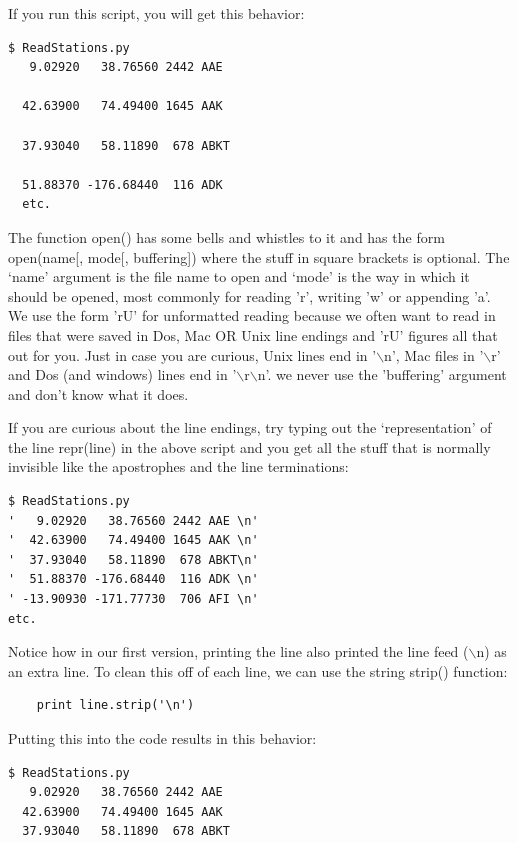 \documentclass[11pt]{book}
\begin{document}
{{If you run this script, you will get this behavior:
{ \color{blue} \begin{verbatim}
$ ReadStations.py
   9.02920   38.76560 2442 AAE

  42.63900   74.49400 1645 AAK

  37.93040   58.11890  678 ABKT

  51.88370 -176.68440  116 ADK
  etc.
  \end{verbatim}}

\noindent The function  {\color{blue}open()} has some bells and whistles to it and has the form  {\color{blue}open(name[, mode[, buffering])} where the stuff in square brackets is optional.  The `name' argument is the file name to open and `mode' is the way in which it should be opened, most commonly for reading 'r', writing 'w' or appending 'a'. We use the form 'rU' for unformatted reading because we often want to read in files that were saved in Dos, Mac OR Unix line endings and 'rU' figures all that out for you.  Just in case you are curious, Unix lines end in '$\backslash$n',  Mac files in '$\backslash$r' and Dos (and windows) lines end in '$\backslash$r$\backslash$n'.    we never use the 'buffering' argument and don't know what it does.

If you are curious about the line endings, try typing out the `representation' of the line {\color{blue}repr(line)} in the above script and you get all the  stuff that is normally  invisible like the apostrophes and the line terminations:

{ \color{blue} \begin{verbatim}
$ ReadStations.py
'   9.02920   38.76560 2442 AAE \n'
'  42.63900   74.49400 1645 AAK \n'
'  37.93040   58.11890  678 ABKT\n'
'  51.88370 -176.68440  116 ADK \n'
' -13.90930 -171.77730  706 AFI \n'
etc.
\end{verbatim}}


\noindent Notice how in our first version, printing the line also printed the line feed ($\backslash$n) as an extra line.  To clean this off of each line, we can use the  string {\color{blue}strip()} function:

{ \color{blue} \begin{verbatim}
    print line.strip('\n')
\end{verbatim}}

\noindent Putting this into the code results in this behavior:

{ \color{blue} \begin{verbatim}
$ ReadStations.py
   9.02920   38.76560 2442 AAE
  42.63900   74.49400 1645 AAK
  37.93040   58.11890  678 ABKT
\end{verbatim}}


}}
\end{document}
